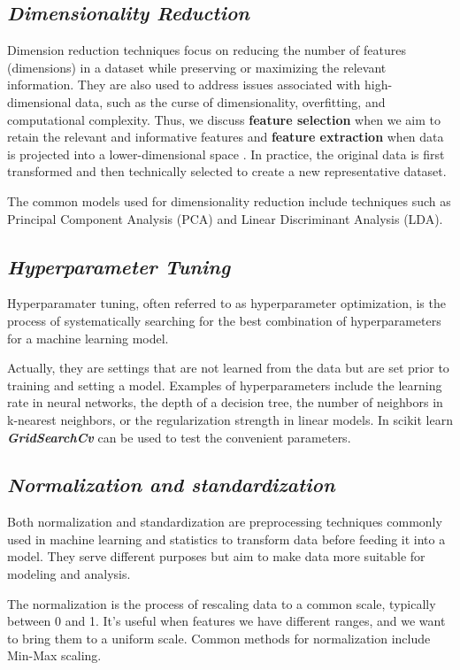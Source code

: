 \documentclass[12pt,a4paper]{report}
\begin{document}
\subsection*{\textit{Dimensionality Reduction}}
Dimension reduction techniques focus on reducing the number of features (dimensions) in a dataset while preserving or maximizing the relevant information. They are also used to address issues associated with high-dimensional data, such as the curse of dimensionality, overfitting, and computational complexity. Thus, we discuss \textbf{feature selection} when we aim to retain the relevant and informative features and \textbf{feature extraction} when data is projected into a lower-dimensional space \cite{cunningham2008dimension}. In practice, the original data is first transformed and then technically selected to create a new representative dataset. 

The common models used for dimensionality reduction include techniques such as Principal Component Analysis (PCA) and Linear Discriminant Analysis (LDA).
\subsection*{\textit{Hyperparameter Tuning}} 
Hyperparamater tuning, often referred to as hyperparameter optimization, is the process of systematically searching for the best combination of hyperparameters for a machine learning model.

Actually, they are settings that are not learned from the data but are set prior to training and setting a model. Examples of hyperparameters include the learning rate in neural networks, the depth of a decision tree, the number of neighbors in k-nearest neighbors, or the regularization strength in linear models. In scikit learn \textit{\textbf{GridSearchCv}} can be used to test the convenient parameters. 

\subsection*{\textit{Normalization and standardization}} 
Both normalization and standardization are preprocessing techniques commonly used in machine learning and statistics to transform data before feeding it into a model. They serve different purposes but aim to make data more suitable for modeling and analysis. 

The normalization is the process of rescaling data to a common scale, typically between 0 and 1. It's useful when features we have different ranges, and we want to bring them to a uniform scale. Common methods for normalization include Min-Max scaling. 
\end{document}
